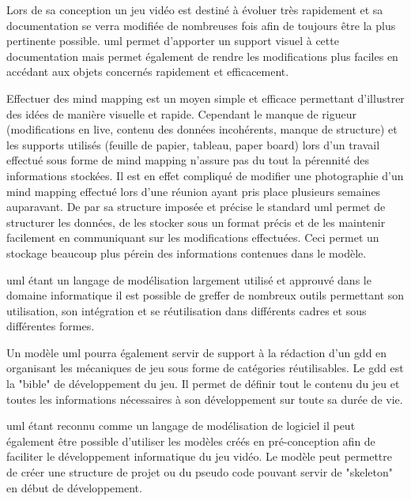 Lors de sa conception un jeu vidéo est destiné à évoluer très rapidement et sa documentation se verra modifiée de nombreuses fois afin de toujours être la plus pertinente possible. \gls{uml} permet d'apporter un support visuel à cette documentation mais permet également de rendre les modifications plus faciles en accédant aux objets concernés rapidement et efficacement. 

Effectuer des mind mapping est un moyen simple et efficace permettant d'illustrer des idées de manière visuelle et rapide. Cependant le manque de rigueur (modifications en live, contenu des données incohérents, manque de structure) et les supports utilisés (feuille de papier, tableau, paper board) lors d'un travail effectué sous forme de mind mapping n'assure pas du tout la pérennité des informations stockées. Il est en effet compliqué de modifier une photographie d'un mind mapping effectué lors d'une réunion ayant pris place plusieurs semaines auparavant. De par sa structure imposée et précise le standard \gls{uml} permet de structurer les données, de les stocker sous un format précis et de les maintenir facilement en communiquant sur les modifications effectuées. Ceci permet un stockage beaucoup plus pérein des informations contenues dans le modèle.

\gls{uml} étant un langage de modélisation largement utilisé et approuvé dans le domaine informatique il est possible de greffer de nombreux outils permettant son utilisation, son intégration et se réutilisation dans différents cadres et sous différentes formes.

Un modèle \gls{uml} pourra également servir de support à la rédaction d'un \gls{gdd} en organisant les mécaniques de jeu sous forme de catégories réutilisables. Le \gls{gdd} est la "bible" de développement du jeu. Il permet de définir tout le contenu du jeu et toutes les informations nécessaires à son développement sur toute sa durée de vie. 

\gls{uml} étant reconnu comme un langage de modélisation de logiciel il peut également être possible d'utiliser les modèles créés en pré-conception afin de faciliter le développement informatique du jeu vidéo. Le modèle peut permettre de créer une structure de projet ou du pseudo code pouvant servir de "skeleton" en début de développement.

